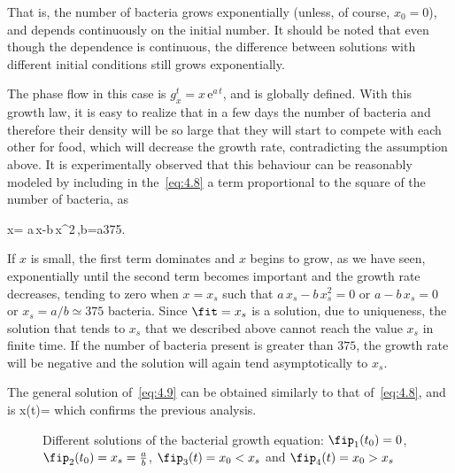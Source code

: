 That is, the number of bacteria grows exponentially (unless, of course, $x_0=0$), and depends continuously on the initial number. It should be noted that even though the dependence is continuous, the difference between solutions with different initial conditions still grows exponentially.

The phase flow in this case is $g^t_x=x\,\mbox{e}^{a\,t}$, and is globally defined. With this growth law, it is easy to realize that in a few days the number of bacteria and therefore their density will be so large that they will start to compete with each other for food, which will decrease the growth rate, contradicting the assumption above. It is experimentally observed that this behaviour can be reasonably modeled by including in the~\ref{eq:4.8} a term proportional to the square of the number of bacteria, as

\beq
\dot x= a\,x-b\,x^2\,,\;\;\;\;\;\;\;\;\;b=\frac a{375}.
\label{eq:4.9}
\eeq

If $x$ is small, the first term dominates and $x$ begins to grow, as we have seen, exponentially until the second term becomes important and the growth rate decreases, tending to zero when $x=x_s$ such that $a\,x_s-b\,x_s^2=0$ or $a-b\,x_s=0$ or $x_s=a/b\simeq 375$ bacteria. Since $\fit=x_s$ is a solution, due to uniqueness, the solution that tends to $x_s$ that we described above cannot reach the value $x_s$ in finite time. If the number of bacteria present is greater than $375$, the growth rate will be negative and the solution will again tend asymptotically to $x_s$.

The general solution of~\ref{eq:4.9} can be obtained similarly to that of~\ref{eq:4.8}, and is
\beq
x(t)=
\eeq 
\noi which confirms the previous analysis.

\espa


\begin{figure}[htbp]
  \begin{center}
    \caption[Different solutions of the bacterial growth equation]{Different solutions of the bacterial growth equation:
$\fip_1(t_0)=0$, $\fip_2(t_0)=x_s=\frac ab$, $\fip_3(t)=x_0<x_s$ and
$\fip_4(t)=x_0>x_s$}
    \label{fig:4_3}
  \end{center}
\end{figure}

